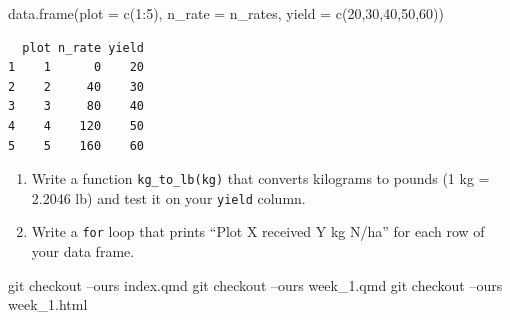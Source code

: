 \documentclass[
  letterpaper,
  DIV=11,
  numbers=noendperiod]{scrartcl}
\newenvironment{Shaded}{\begin{snugshade}}{\end{snugshade}}
\newcommand{\AttributeTok}[1]{\textcolor[rgb]{0.40,0.45,0.13}{#1}}
\newcommand{\DecValTok}[1]{\textcolor[rgb]{0.68,0.00,0.00}{#1}}
\newcommand{\FunctionTok}[1]{\textcolor[rgb]{0.28,0.35,0.67}{#1}}
\newcommand{\NormalTok}[1]{\textcolor[rgb]{0.00,0.23,0.31}{#1}}
\newcommand{\SpecialCharTok}[1]{\textcolor[rgb]{0.37,0.37,0.37}{#1}}
\begin{document}
\begin{Shaded}
\begin{Highlighting}[]
\FunctionTok{data.frame}\NormalTok{(}\AttributeTok{plot =} \FunctionTok{c}\NormalTok{(}\DecValTok{1}\SpecialCharTok{:}\DecValTok{5}\NormalTok{), }
           \AttributeTok{n\_rate =}\NormalTok{ n\_rates,}
           \AttributeTok{yield =} \FunctionTok{c}\NormalTok{(}\DecValTok{20}\NormalTok{,}\DecValTok{30}\NormalTok{,}\DecValTok{40}\NormalTok{,}\DecValTok{50}\NormalTok{,}\DecValTok{60}\NormalTok{))}
\end{Highlighting}
\end{Shaded}

\begin{verbatim}
  plot n_rate yield
1    1      0    20
2    2     40    30
3    3     80    40
4    4    120    50
5    5    160    60
\end{verbatim}

\begin{enumerate}
\def\labelenumi{\arabic{enumi}.}
\setcounter{enumi}{2}
\item
  Write a function \texttt{kg\_to\_lb(kg)} that converts kilograms to
  pounds (1 kg = 2.2046 lb) and test it on your \texttt{yield} column.
\item
  Write a \texttt{for} loop that prints ``Plot X received Y kg N/ha''
  for each row of your data frame.
\end{enumerate}

git checkout --ours index.qmd git checkout --ours week\_1.qmd git
checkout --ours week\_1.html
\end{document}
